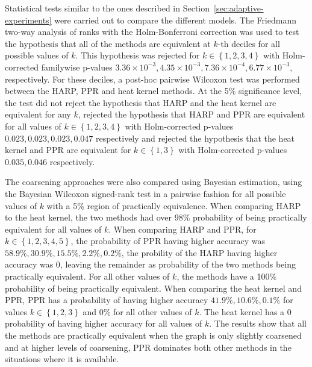 Statistical tests similar to the ones described in Section~\ref{sec:adaptive-experiments} were carried out to compare the different models. The Friedmann two-way analysis of ranks with the Holm-Bonferroni correction was used to test the hypothesis that all of the methods are equivalent at \( k \)-th deciles for all possible values of \( k \). This hypothesis was rejected for \( k \in \left\{ 1, 2, 3, 4 \right\} \) with Holm-corrected familywise p-values \( 3.36 \times 10^{-3}, 4.35 \times 10^{-3}, 7.36 \times 10^{-4}, 6.77 \times 10^{-3} \), respectively. For these deciles, a post-hoc pairwise Wilcoxon test was performed between the HARP, PPR and heat kernel methods. At the 5\% significance level, the test did not reject the hypothesis that HARP and the heat kernel are equivalent for any \( k \), rejected the hypothesis that HARP and PPR are equivalent for all values of \( k \in \left\{ 1, 2, 3, 4 \right\} \) with Holm-corrected p-values \( 0.023, 0.023, 0.023, 0.047 \) respectively and rejected the hypothesis that the heat kernel and PPR are equivalent for \( k \in \left\{ 1, 3 \right\} \) with Holm-corrected p-values \( 0.035, 0.046 \) respectively.

The coarsening approaches were also compared using Bayesian estimation, using the Bayesian Wilcoxon signed-rank test in a pairwise fashion for all possible values of \( k \) with a 5\% region of practically equivalence. When comparing HARP to the heat kernel, the two methods had over 98\% probability of being practically equivalent for all values of \( k \). When comparing HARP and PPR, for \( k \in \left\{ 1, 2, 3, 4, 5 \right\} \), the probability of PPR having higher accuracy was \( 58.9\%, 30.9\%, 15.5\%, 2.2\%, 0.2\% \), the probility of the HARP having higher accuracy was 0, leaving the remainder as probability of the two methods being practically equivalent. For all other values of \( k \), the methods have a 100\% probability of being practically equivalent. When comparing the heat kernel and PPR, PPR has a probability of having higher accuracy \( 41.9\%, 10.6\%, 0.1\% \) for values \( k \in \left\{ 1, 2, 3 \right\} \) and 0\% for all other values of \( k \). The heat kernel has a 0 probability of having higher accuracy for all values of \( k \). The results show that all the methods are practically equivalent when the graph is only slightly coarsened and at higher levels of coarsening, PPR dominates both other methods in the situations where it is available.

